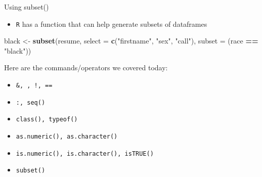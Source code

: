 \documentclass[ignorenonframetext,]{beamer}
\newenvironment{Shaded}{\begin{snugshade}}{\end{snugshade}}
\newcommand{\KeywordTok}[1]{\textcolor[rgb]{0.13,0.29,0.53}{\textbf{#1}}}
\newcommand{\DataTypeTok}[1]{\textcolor[rgb]{0.13,0.29,0.53}{#1}}
\newcommand{\StringTok}[1]{\textcolor[rgb]{0.31,0.60,0.02}{#1}}
\newcommand{\OperatorTok}[1]{\textcolor[rgb]{0.81,0.36,0.00}{\textbf{#1}}}
\newcommand{\NormalTok}[1]{#1}
\providecommand{\tightlist}{%
	\setlength{\itemsep}{0pt}\setlength{\parskip}{0pt}}
\begin{document}
\begin{frame}[fragile]{Using subset()}

\begin{itemize}
\tightlist
\item
  \texttt{R} has a function that can help generate subsets of dataframes
\end{itemize}

\begin{Shaded}
\begin{Highlighting}[]
\NormalTok{black <-}\StringTok{ }\KeywordTok{subset}\NormalTok{(resume, }\DataTypeTok{select =} \KeywordTok{c}\NormalTok{(}\StringTok{"firstname"}\NormalTok{, }\StringTok{"sex"}\NormalTok{, }
        \StringTok{"call"}\NormalTok{), }\DataTypeTok{subset =}\NormalTok{ (}\StringTok{race} \OperatorTok{==}\StringTok{ "black"}\NormalTok{))}
\end{Highlighting}
\end{Shaded}

\end{frame}

\begin{frame}[fragile]{Here are the commands/operators we covered
today:}

\begin{itemize}
\tightlist
\item
  \texttt{\&,\ \textbar{},\ !,\ ==}
\item
  \texttt{:,\ seq()}
\item
  \texttt{class(),\ typeof()}
\item
  \texttt{as.numeric(),\ as.character()}
\item
  \texttt{is.numeric(),\ is.character(),\ isTRUE()}
\item
  \texttt{subset()}
\end{itemize}

\end{frame}
\end{document}
